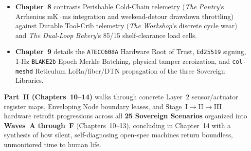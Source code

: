 \begin{itemize}
    \item \textbf{Chapter~8} contrasts Perishable Cold-Chain telemetry (\textit{The Pantry}'s Arrhenius $\mathrm{mK\cdot ms}$ integration and weekend-detour drawdown throttling) against Durable Tool-Crib telemetry (\textit{The Workshop}'s discrete cycle wear) and \textit{The Dual-Loop Bakery}'s 85/15 shelf-clearance load cells.
    \item \textbf{Chapter~9} details the \texttt{ATECC608A} Hardware Root of Trust, \texttt{Ed25519} signing, 1-Hz \texttt{BLAKE2b} Epoch Merkle Batching, physical tamper zeroization, and \texttt{col-meshd} Reticulum LoRa/fiber/DTN propagation of the three Sovereign Libraries.
\end{itemize}

\textbf{Part~II (Chapters~10--14)} walks through concrete Layer~2 sensor/actuator register maps, Enveloping Node boundary leases, and Stage~I$\to$II$\to$III hardware retrofit progressions across all \textbf{25 Sovereign Scenarios} organized into \textbf{Waves~A through~F} (Chapters~10--13), concluding in Chapter~14 with a synthesis of how silent, self-diagnosing open-spec machines return boundless, unmonitored time to human life.
